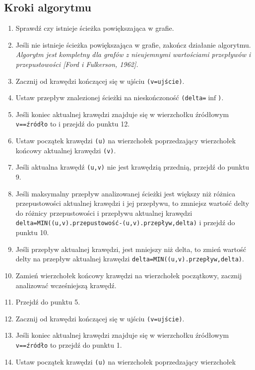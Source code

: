 \documentclass[10pt]{dokument-tiwo}
\begin{document}
\subsection{Kroki algorytmu}
\begin{enumerate}
    \item%
    Sprawdź czy istnieje ścieżka powiększająca w grafie.
    \item%
    Jeśli nie istnieje ścieżka powiększająca w grafie, zakończ działanie algorytmu.\\
    \emph{Algorytm jest kompletny dla grafów z nieujemnymi wartościami
    przepływów i przepustowości [Ford i Fulkerson, 1962].}
    \item%
    Zacznij od krawędzi kończącej się w ujściu \texttt{(v=ujście)}.
    \item%
    Ustaw przepływ znalezionej ścieżki na nieskończoność \texttt{(delta=$\inf$)}.
    \item%
    Jeśli koniec aktualnej krawędzi znajduje się w wierzchołku źródłowym
    \texttt{v==źródło} to i przejdź do punktu 12.
    \item%
    Ustaw początek krawędzi \texttt{(u)} na wierzchołek poprzedzający
    wierzchołek końcowy aktualnej krawędzi \texttt{(v)}.
    \item%
    Jeśli aktualna krawędź \texttt{(u,v)} nie jest krawędzią przednią, przejdź
    do punktu 9.
    \item%
    Jeśli maksymalny przepływ analizowanej ścieżki jest większy niż różnica
    przepustowości aktualnej krawędzi i jej przepływu, to zmniejsz wartość delty
    do różnicy przepustowości i przepływu aktualnej krawędzi
    \texttt{delta=MIN((u,v).przepustowość-(u,v).przepływ,delta)} i przejdź do
    punktu 10.
    \item%
    Jeśli przepływ aktualnej krawędzi, jest mniejszy niż delta, to zmień wartość
    delty na przepływ aktualnej krawędzi
    \texttt{delta=MIN((u,v).przepływ,delta)}.
    \item%
    Zamień wierzchołek końcowy krawędzi na wierzchołek początkowy, zacznij
    analizować wcześniejszą krawędź.
    \item%
    Przejdź do punktu 5.
    \item%
    Zacznij od krawędzi kończącej się w ujściu \texttt{(v=ujście)}.
    \item%
    Jeśli koniec aktualnej krawędzi znajduje się w wierzchołku źródłowym
    \texttt{v==źródło} to przejdź do punktu 1.
    \item%
    Ustaw początek krawędzi \texttt{(u)} na wierzchołek poprzedzający wierzchołek

\end{enumerate}
\end{document}

